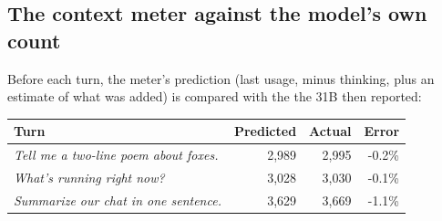 \subsection*{The context meter against the model's own count}
Before each turn, the meter's prediction (last usage, minus thinking, plus an estimate of what was added) is compared with the  the 31B then reported:
\par\medskip\noindent\begin{tabular}{@{}lrrr@{}}\toprule Turn & Predicted & Actual & Error \\ \midrule
\emph{Tell me a two-line poem about foxes.} & 2,989 & 2,995 & -0.2\% \\
\emph{What's running right now?} & 3,028 & 3,030 & -0.1\% \\
\emph{Summarize our chat in one sentence.} & 3,629 & 3,669 & -1.1\% \\
\bottomrule\end{tabular}\par
